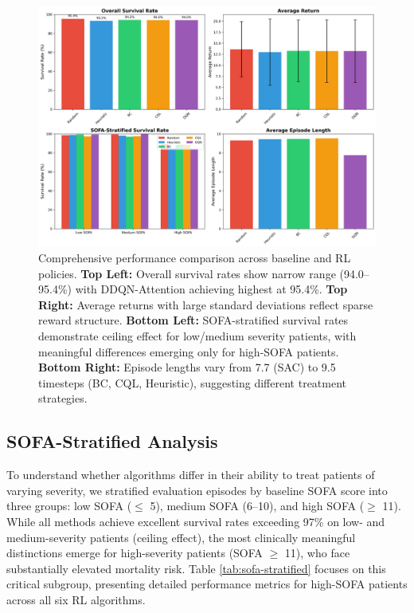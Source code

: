 \begin{figure}[htbp]
\centering
\includegraphics[width=\textwidth]{../results/figures/algorithm_comparison.png}
\caption{Comprehensive performance comparison across baseline and RL policies. \textbf{Top Left:} Overall survival rates show narrow range (94.0--95.4\%) with DDQN-Attention achieving highest at 95.4\%. \textbf{Top Right:} Average returns with large standard deviations reflect sparse reward structure. \textbf{Bottom Left:} SOFA-stratified survival rates demonstrate ceiling effect for low/medium severity patients, with meaningful differences emerging only for high-SOFA patients. \textbf{Bottom Right:} Episode lengths vary from 7.7 (SAC) to 9.5 timesteps (BC, CQL, Heuristic), suggesting different treatment strategies.}
\label{fig:algorithm-comparison}
\end{figure}


\subsection{SOFA-Stratified Analysis}\label{sec:results:sofa}

To understand whether algorithms differ in their ability to treat patients of varying severity, we stratified evaluation episodes by baseline SOFA score into three groups: low SOFA ($\leq$ 5), medium SOFA (6--10), and high SOFA ($\geq$ 11). While all methods achieve excellent survival rates exceeding 97\% on low- and medium-severity patients (ceiling effect), the most clinically meaningful distinctions emerge for high-severity patients (SOFA $\geq$ 11), who face substantially elevated mortality risk. Table \ref{tab:sofa-stratified} focuses on this critical subgroup, presenting detailed performance metrics for high-SOFA patients across all six RL algorithms.

